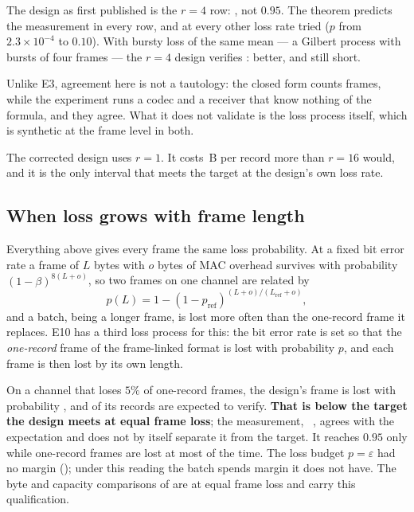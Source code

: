 The design as first published is the $r = 4$ row: \lossVFour, not $0.95$. The theorem predicts
the measurement in every row, and at every other loss rate tried ($p$ from $2.3\times10^{-4}$ to
$0.10$). With bursty loss of the same mean --- a Gilbert process with bursts of four frames ---
the $r = 4$ design verifies \lossVFourBurst: better, and still short.

\begin{remark}
Unlike E3, agreement here is not a tautology: the closed form counts frames, while the experiment
runs a codec and a receiver that know nothing of the formula, and they agree. What it does not
validate is the loss process itself, which is synthetic at the frame level in both.
\end{remark}

The corrected design uses $r = 1$. It costs \lossPrize\,B per record more than $r = 16$ would,
and it is the only interval that meets the target at the design's own loss rate.

\subsection{When loss grows with frame length}\label{sec:loss-length}

Everything above gives every frame the same loss probability. At a fixed bit error rate a frame
of $L$ bytes with $o$ bytes of MAC overhead survives with probability $(1-\beta)^{8(L+o)}$, so
two frames on one channel are related by
\[
p(L) = 1 - (1 - p_{\mathrm{ref}})^{(L+o)/(L_{\mathrm{ref}}+o)} ,
\]
and a batch, being a longer frame, is lost more often than the one-record frame it replaces.
E10 has a third loss process for this: the bit error rate is set so that the \emph{one-record}
frame of the frame-linked format is lost with probability $p$, and each frame is then lost by its own
length.

On a channel that loses $5\%$ of one-record frames, the design's frame is lost with probability
\lossBerP, and \lossBerTh{} of its records are expected to verify. \textbf{That is below the target the
design meets at equal frame loss}; the measurement, \lossBerV~\lossBerCi, agrees with the
expectation and does not by itself separate it from the target. It reaches $0.95$ only while one-record frames are lost at most \lossBerPmax{} of the
time. The loss budget $p = \varepsilon$ had no margin (); under this reading
the batch spends margin it does not have. The byte and capacity comparisons of
 are at equal frame loss and carry this qualification.


